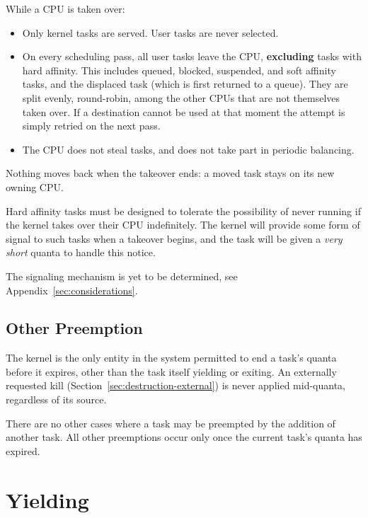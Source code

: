 \documentclass[11pt]{article}
\begin{document}
While a CPU is taken over:

\begin{itemize}
	\item Only kernel tasks are served. User tasks are never selected.
	\item On every scheduling pass, all user tasks leave the CPU, \textbf{excluding} tasks with hard affinity. This includes queued, blocked, suspended, and soft affinity tasks, and the displaced task (which is first returned to a queue). They are split evenly, round-robin, among the other CPUs that are not themselves taken over. If a destination cannot be used at that moment the attempt is simply retried on the next pass.
	\item The CPU does not steal tasks, and does not take part in periodic balancing.
\end{itemize}

Nothing moves back when the takeover ends: a moved task stays on its new owning CPU.

Hard affinity tasks must be designed to tolerate the possibility of never running if the kernel takes over their CPU indefinitely.
The kernel will provide some form of signal to such tasks when a takeover begins, and the task will be given a \textit{very short} quanta to handle this notice.

\begin{specnote}
	The signaling mechanism is yet to be determined, see Appendix~\ref{sec:considerations}.
\end{specnote}

\subsection{Other Preemption}

The kernel is the only entity in the system permitted to end a task's quanta before it expires, other than the task itself yielding or exiting.
An externally requested kill (Section~\ref{sec:destruction-external}) is never applied mid-quanta, regardless of its source.

There are no other cases where a task may be preempted by the addition of another task. All other preemptions occur only once the current task's quanta has expired.

\section{Yielding}
\label{sec:yielding}
\end{document}
